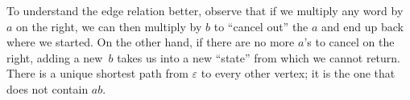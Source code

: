 \documentclass[../generics]{subfiles}
\begin{document}
\begin{example}
\begin{center}
\end{center}

To understand the edge relation better, observe that if we multiply any word by $a$ on the right, we can then multiply by $b$ to ``cancel out'' the $a$ and end up back where we started. On the other hand, if there are no more $a$'s to cancel on the right, adding a new~$b$ takes us into a new ``state'' from which we cannot return. There is a unique shortest path from $\varepsilon$ to every other vertex; it is the one that does not contain $ab$.
\end{example}
\end{document}
